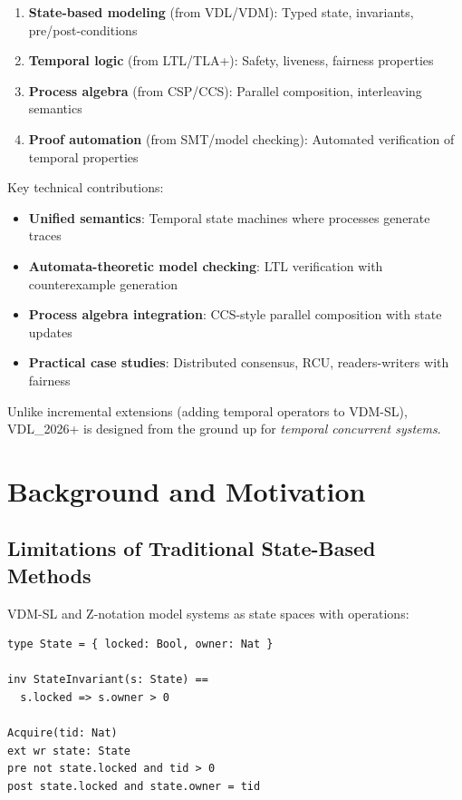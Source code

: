 \documentclass[conference]{IEEEtran}
\begin{document}
\begin{enumerate}
\item \textbf{State-based modeling} (from VDL/VDM): Typed state, invariants, pre/post-conditions
\item \textbf{Temporal logic} (from LTL/TLA+): Safety, liveness, fairness properties
\item \textbf{Process algebra} (from CSP/CCS): Parallel composition, interleaving semantics
\item \textbf{Proof automation} (from SMT/model checking): Automated verification of temporal properties
\end{enumerate}

Key technical contributions:
\begin{itemize}
\item \textbf{Unified semantics}: Temporal state machines where processes generate traces
\item \textbf{Automata-theoretic model checking}: LTL verification with counterexample generation
\item \textbf{Process algebra integration}: CCS-style parallel composition with state updates
\item \textbf{Practical case studies}: Distributed consensus, RCU, readers-writers with fairness
\end{itemize}

Unlike incremental extensions (adding temporal operators to VDM-SL), VDL\_2026+ is designed from the ground up for \textit{temporal concurrent systems}.

\section{Background and Motivation}
\label{sec:background}

\subsection{Limitations of Traditional State-Based Methods}

VDM-SL and Z-notation model systems as state spaces with operations:

\begin{lstlisting}[caption={VDM-SL style specification}]
type State = { locked: Bool, owner: Nat }

inv StateInvariant(s: State) ==
  s.locked => s.owner > 0

Acquire(tid: Nat)
ext wr state: State
pre not state.locked and tid > 0
post state.locked and state.owner = tid
\end{lstlisting}
\end{document}
